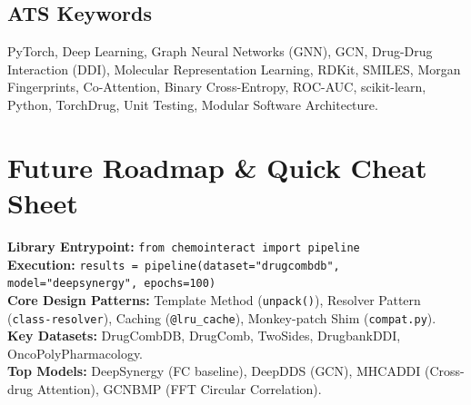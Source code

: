 \documentclass[12pt,a4paper,oneside]{article}
\begin{document}
\subsection{ATS Keywords}
PyTorch, Deep Learning, Graph Neural Networks (GNN), GCN, Drug-Drug Interaction (DDI), Molecular Representation Learning, RDKit, SMILES, Morgan Fingerprints, Co-Attention, Binary Cross-Entropy, ROC-AUC, scikit-learn, Python, TorchDrug, Unit Testing, Modular Software Architecture.

\section{Future Roadmap & Quick Cheat Sheet}\label{sec:cheatsheet}

\begin{tcolorbox}[cheatbox,title={ChemoInteract Quick Reference Cheat Sheet}]
\textbf{Library Entrypoint:} \texttt{from chemointeract import pipeline} \\
\textbf{Execution:} \texttt{results = pipeline(dataset="drugcombdb", model="deepsynergy", epochs=100)} \\
\textbf{Core Design Patterns:} Template Method (\texttt{unpack()}), Resolver Pattern (\texttt{class-resolver}), Caching (\texttt{@lru\_cache}), Monkey-patch Shim (\texttt{compat.py}). \\
\textbf{Key Datasets:} DrugCombDB, DrugComb, TwoSides, DrugbankDDI, OncoPolyPharmacology. \\
\textbf{Top Models:} DeepSynergy (FC baseline), DeepDDS (GCN), MHCADDI (Cross-drug Attention), GCNBMP (FFT Circular Correlation).
\end{tcolorbox}
\end{document}
